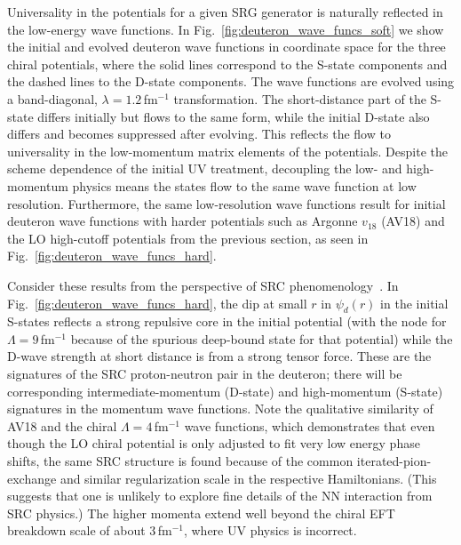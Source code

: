 \documentclass[10pt,aps,prc,floatfix,twocolumn,nofootinbib]{revtex4-1}
\begin{document}
Universality in the potentials for a given SRG generator is naturally reflected in the low-energy wave functions.
In Fig.~\ref{fig:deuteron_wave_funcs_soft} we show the initial and evolved deuteron wave functions in coordinate space for the three chiral potentials, where the solid lines correspond to the S-state components and the dashed lines to the D-state components.
The wave functions are evolved using a band-diagonal, $\lambda=1.2$\,fm$^{-1}$ transformation.
The short-distance part of the S-state differs initially but flows to the same form, while the initial D-state also differs and becomes suppressed after evolving.
This reflects the flow to universality in the low-momentum matrix elements of the potentials.
Despite the scheme dependence of the initial UV treatment, decoupling the low- and high-momentum physics means the states flow to the same wave function at low resolution.
Furthermore, the same low-resolution wave functions result for initial
deuteron wave functions with harder potentials such as Argonne $v_{18}$ (AV18) \cite{Wiringa:1994wb} and the LO high-cutoff potentials from the previous section, as seen in Fig.~\ref{fig:deuteron_wave_funcs_hard}.


Consider these results from the perspective of SRC phenomenology~\cite{Hen:2016kwk,Weiss:2016obx,Cruz-Torres:2019fum,Schmidt:2020kcl}.
In Fig.~\ref{fig:deuteron_wave_funcs_hard}, the dip at small $r$ in $\psi_d(r)$ in the initial S-states reflects a strong repulsive core in the initial potential (with the node for $\Lambda=9$\,fm$^{-1}$ because of the spurious deep-bound state for that potential) while the D-wave strength at short distance is from a strong tensor force.
These are the signatures of the SRC proton-neutron pair in the deuteron; there will be corresponding intermediate-momentum (D-state) and high-momentum (S-state) signatures in the momentum wave functions.
Note the qualitative similarity of AV18 and the chiral $\Lambda=4$\,fm$^{-1}$ wave functions, which demonstrates that even though the LO chiral potential is only adjusted to fit very low energy phase shifts, the same SRC structure is found because of the common iterated-pion-exchange and similar regularization scale in the respective Hamiltonians.
(This suggests that one is unlikely to explore fine details of the NN interaction from SRC physics.)
The higher momenta extend well beyond the chiral EFT breakdown scale of about 3\,fm$^{-1}$, where UV physics is incorrect.
\end{document}
